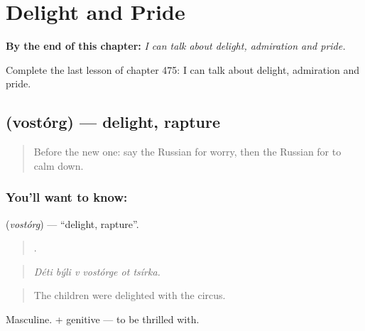
\chapter{Delight and Pride}
\label{ch:ru-delight-and-pride}

\begin{chapteropening}
\textbf{By the end of this chapter:} \emph{I can talk about delight, admiration and pride.}

Complete the last lesson of chapter 475: I can talk about delight, admiration and pride.
\end{chapteropening}

\section[\texorpdfstring{\ru{восторг} (vostórg)}{восторг (vostórg)}]{ (vostórg) — delight, rapture}

\label{lesson:RU-C475-vostorg}



\begin{quote}
Before the new one: say the Russian for worry, then the Russian for to calm down.
\end{quote}

\subsection*{You'll want to know: }
\textbf{} (\emph{vostórg}) — \textquotedblleft{}delight, rapture\textquotedblright{}.

\begin{quote}
     .
\end{quote}

\begin{quote}
\emph{Déti býli v vostórge ot tsírka.}
\end{quote}

\begin{quote}
The children were delighted with the circus.
\end{quote}

Masculine. \emph{   } + genitive — to be thrilled with.

